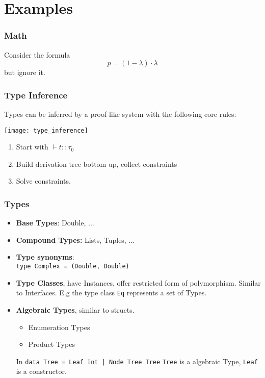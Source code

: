 \part{Examples}

\section{Math}

Consider the formula
$$p = (1-\lambda)\cdot\lambda$$
but ignore it.

\section{Type Inference}
Types can be inferred by a proof-like system with the following core rules:
\begin{center}
 \texttt{[image: type\_inference]}
\end{center}
\begin{enumerate}
	\item Start with $\vdash t:: \tau_{0}$
	\item Build derivation tree bottom up, collect constraints
	\item Solve constraints.
\end{enumerate}

\section{Types}
\begin{itemize}
	\item \textbf{Base Types}: Double, ...
	\item \textbf{Compound Types:} Lists, Tuples, ...
	\item \textbf{Type synonyms}: \\
		\verb+type Complex = (Double, Double)+
	\item \textbf{Type Classes}, have Instances, offer restricted form of polymorphism. Similar to Interfaces. E.g the type class \verb+Eq+ represents a set of Types.
	\item \textbf{Algebraic Types}, similar to structs.
		\begin{itemize}
			\item Enumeration Types
			\item Product Types
		\end{itemize}
	In \verb+data Tree = Leaf Int | Node Tree Tree+
	\verb+Tree+ is a algebraic Type, \verb+Leaf+ is a constructor.
\end{itemize}

